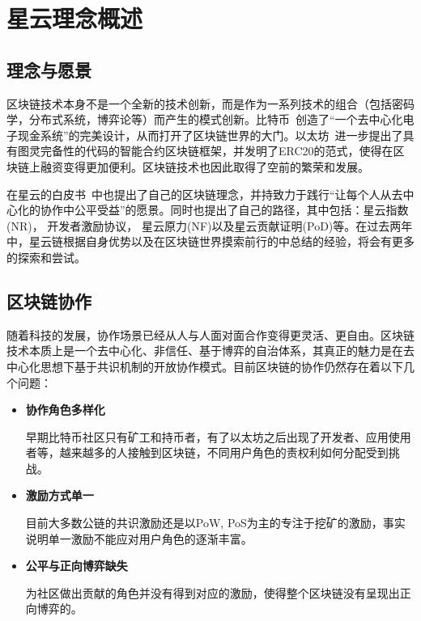 \section{星云理念概述}

\subsection{理念与愿景}
区块链技术本身不是一个全新的技术创新，而是作为一系列技术的组合（包括密码学，分布式系统，博弈论等）而产生的模式创新。比特币~\cite{Nakamoto2008}创造了“⼀个去中⼼化电⼦现⾦系统”的完美设计，从而打开了区块链世界的大门。以太坊~\cite{buterin2013ethereum}进一步提出了具有图灵完备性的代码的智能合约区块链框架，并发明了ERC20的范式，使得在区块链上融资变得更加便利。区块链技术也因此取得了空前的繁荣和发展。

在星云的白皮书~\cite{whitepaper}中也提出了自己的区块链理念，并持致力于践行“让每个人从去中心化的协作中公平受益”的愿景。同时也提出了自己的路径，其中包括：星云指数(NR)， 开发者激励协议， 星云原力(NF)以及星云贡献证明(PoD)等。在过去两年中，星云链根据自身优势以及在区块链世界摸索前行的中总结的经验，将会有更多的探索和尝试。


\subsection{区块链协作}
随着科技的发展，协作场景已经从人与人面对面合作变得更灵活、更自由。区块链技术本质上是一个去中心化、非信任、基于博弈的自治体系，其真正的魅力是在去中心化思想下基于共识机制的开放协作模式。目前区块链的协作仍然存在着以下几个问题：

\begin{itemize}

	\item \textbf{协作角色多样化}

	早期比特币社区只有矿工和持币者，有了以太坊之后出现了开发者、应用使用者等，越来越多的人接触到区块链，不同用户角色的责权利如何分配受到挑战。

	\item \textbf{激励方式单一}

	目前大多数公链的共识激励还是以PoW, PoS为主的专注于挖矿的激励，事实说明单一激励不能应对用户角色的逐渐丰富。

	\item \textbf{公平与正向博弈缺失}

	为社区做出贡献的角色并没有得到对应的激励，使得整个区块链没有呈现出正向博弈的。

\end{itemize}